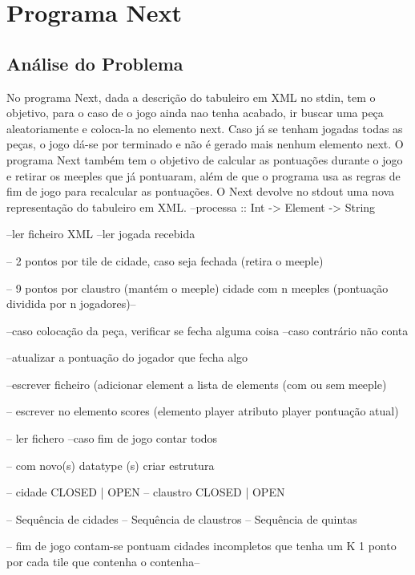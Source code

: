 \chapter{Programa Next}

\section{Análise do Problema}


No programa Next, dada a descrição do tabuleiro em XML no stdin, tem o objetivo, para o caso de o jogo ainda
nao tenha acabado, ir buscar uma peça aleatoriamente e coloca-la no elemento next. Caso já se tenham jogadas
todas as  peças, o jogo  dá-se por terminado  e não é  gerado mais nenhum  elemento next. O  programa Next
também tem  o objetivo de calcular  as pontuações durante  o jogo e  retirar os meeples que  já pontuaram,
além de que o programa usa as regras de fim de jogo para recalcular as pontuações. O Next devolve no stdout
uma nova representação do tabuleiro em XML.
--processa :: Int -> Element -> String

--ler ficheiro XML
--ler jogada recebida

  --  2 pontos por tile de cidade, caso seja fechada (retira o meeple)

  {-- 9 pontos por claustro (mantém o meeple)
        cidade com n meeples (pontuação dividida por n jogadores)--}

--caso colocação da peça, verificar se fecha alguma coisa
--caso contrário não conta

--atualizar a pontuação do jogador que fecha algo

--escrever ficheiro (adicionar element a lista de elements (com ou sem meeple)

-- escrever no elemento scores (elemento player atributo player pontuação atual)

-- ler fichero
--caso fim de jogo contar todos 

-- com novo(s)  datatype (s) criar estrutura 

	-- cidade CLOSED | OPEN
	-- claustro CLOSED | OPEN
	

	-- Sequência de cidades 
        -- Sequência de claustros  
	-- Sequência de quintas


  {-- fim de jogo contam-se pontuam cidades incompletos que tenha um K
        1 ponto por cada tile que contenha o contenha--}

